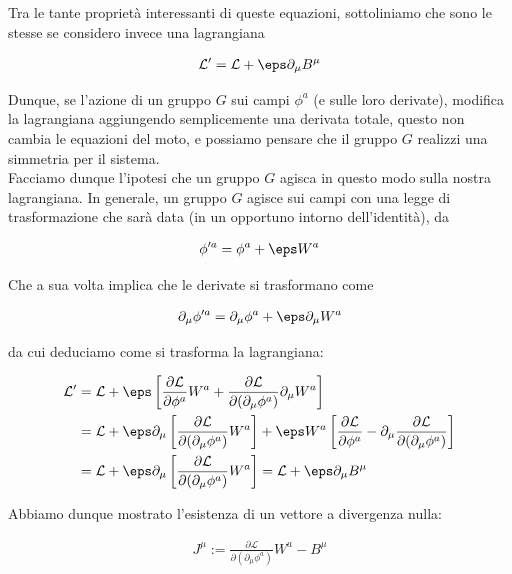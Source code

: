 \documentclass{report}
\begin{document}
Tra le tante proprietà interessanti di queste equazioni, sottoliniamo che sono le stesse se considero invece una lagrangiana 

\begin{align}
    \mathcal{L}' = \mathcal{L} + \eps \partial_\mu B^{\mu}
\end{align}

Dunque, se l'azione di un gruppo \(G\) sui campi \(\phi^a\) (e sulle loro derivate), modifica la lagrangiana aggiungendo semplicemente una derivata totale, questo non cambia le equazioni del moto, e possiamo pensare che il gruppo \(G\) realizzi una simmetria per il sistema. \\

Facciamo dunque l'ipotesi che un gruppo \(G\) agisca in questo modo sulla nostra lagrangiana. In generale, un gruppo \(G\) agisce sui campi con una legge di trasformazione che sarà data (in un opportuno intorno dell'identità), da 

\begin{align}
    \phi'^a = \phi^a + \eps W^a
\end{align}

Che a sua volta implica che le derivate si trasformano come 

\begin{align}
    \partial_\mu \phi'^a = \partial_\mu \phi^a + \eps \partial_\mu W^a
\end{align}

da cui deduciamo come si trasforma la lagrangiana:

\begin{align}
    \mathcal{L}' &= \mathcal{L} + \eps\left[\frac{\partial \mathcal{L}}{\partial \phi^a} W^a + \frac{\partial \mathcal{L}}{\partial (\partial_\mu \phi^a)}\partial_\mu W^a\right] \\
    &= \mathcal{L} + \eps\partial_\mu\left[\frac{\partial \mathcal{L}}{\partial (\partial_\mu \phi^a)}W^a\right] +\eps W^a \left[\frac{\partial \mathcal{L}}{\partial \phi^a} - \partial_\mu \frac{\partial \mathcal{L}}{\partial (\partial_\mu \phi^a)}\right] \\
    &= \mathcal{L} + \eps\partial_\mu\left[\frac{\partial \mathcal{L}}{\partial (\partial_\mu \phi^a)}W^a\right] = \mathcal{L} + \eps \partial_\mu B^{\mu}
\end{align}

Abbiamo dunque mostrato l'esistenza di un vettore a divergenza nulla: 

\begin{align}
    J^{\mu} := \frac{\partial \mathcal{L}}{\partial (\partial_\mu \phi^a)}W^a - B^\mu
\end{align}
\end{document}
